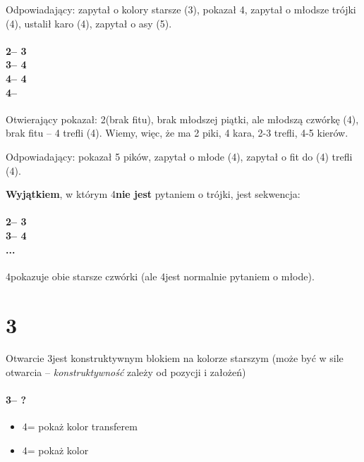 \documentclass[12pt, a4paper]{report}
\begin{document}
{    Odpowiadający: zapytał o kolory starsze (3\clubs), pokazał 4\spades,
    zapytał o młodsze trójki (4\diams), ustalił karo (4\nt),
    zapytał o asy (5\hearts).

    \subsubsection*{2\nt -- 3\hearts\\
                    3\spades -- 4\clubs\\
                    4\diams -- 4\hearts\\
                    4\nt -- \pass
                    }

    Otwierający pokazał: 2\spades (brak fitu), brak młodszej piątki,
    ale młodszą czwórkę (4\diams), brak fitu -- 4 trefli (4\nt).
    Wiemy, więc, że ma 2 piki, 4 kara, 2-3 trefli, 4-5 kierów.

    Odpowiadający: pokazał 5 pików, zapytał o młode (4\clubs),
    zapytał o fit do (4) trefli (4\hearts).

    \vspace{0.5cm}

    \textbf{Wyjątkiem}, w którym 4\diams \textbf{nie jest} pytaniem o trójki, jest sekwencja:
    \subsubsection*{2\nt -- 3\clubs\\
                    3\diams -- 4\diams\\
                    ...}
    4\diams pokazuje obie starsze czwórki (ale 4\clubs jest normalnie pytaniem o młode).



    \chapter*{\colorbox{Plum!30}{3\ntx}}
     {
        Otwarcie 3\nt jest konstruktywnym blokiem na kolorze starszym 
        (może być w sile otwarcia -- \textit{konstruktywność} zależy od pozycji i założeń)
        \subsubsection*{3\nt -- ?}
        \begin{itemize}
            \item 4\clubs = pokaż kolor transferem
            \item 4\diams = pokaż kolor
        \end{itemize}
    }
}
\end{document}
